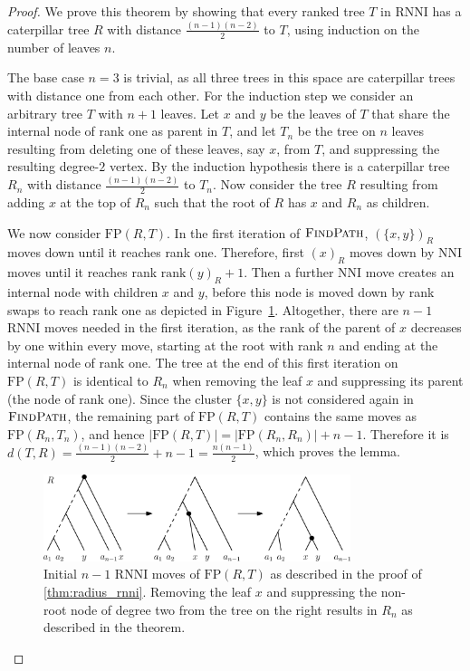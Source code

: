 \documentclass[11pt]{amsart}
\newcommand{\rnni}{\mathrm{RNNI}}
\newcommand{\findpath}{\textsc{FindPath}}
\newcommand{\rank}{\mathrm{rank}}
\newcommand{\nni}{\mathrm{NNI}}
\newcommand{\fp}{\mathrm{FP}}
\providecommand{\DIFaddtex}[1]{{\protect\color{blue}\uwave{#1}}} %
\providecommand{\DIFdeltex}[1]{{\protect\color{red}\sout{#1}}}                      %
\providecommand{\DIFaddbegin}{} %
\providecommand{\DIFaddend}{} %
\providecommand{\DIFdelbegin}{} %
\providecommand{\DIFdelend}{} %
\providecommand{\DIFadd}[1]{\texorpdfstring{\DIFaddtex{#1}}{#1}} %
\providecommand{\DIFdel}[1]{\texorpdfstring{\DIFdeltex{#1}}{}} %
\newcommand{\DIFscaledelfig}{0.5}
\newlength{\DIFdelgraphicswidth} %
\newlength{\DIFdelgraphicsheight} %
\newcommand{\DIFaddincludegraphics}[2][]{{\color{blue}\fbox{\DIFOincludegraphics[#1]{#2}}}} %
\newcommand{\DIFdelincludegraphics}[2][]{%
\sbox{\DIFdelgraphicsbox}{\DIFOincludegraphics[#1]{#2}}%
\settoboxwidth{\DIFdelgraphicswidth}{\DIFdelgraphicsbox} %
\settoboxtotalheight{\DIFdelgraphicsheight}{\DIFdelgraphicsbox} %
\scalebox{\DIFscaledelfig}{%
\parbox[b]{\DIFdelgraphicswidth}{\usebox{\DIFdelgraphicsbox}\\[-\baselineskip] \rule{\DIFdelgraphicswidth}{0em}}\llap{\resizebox{\DIFdelgraphicswidth}{\DIFdelgraphicsheight}{%
\setlength{\unitlength}{\DIFdelgraphicswidth}%
\begin{picture}(1,1)%
\thicklines\linethickness{2pt} %
{\color[rgb]{1,0,0}\put(0,0){\framebox(1,1){}}}%
{\color[rgb]{1,0,0}\put(0,0){\line( 1,1){1}}}%
{\color[rgb]{1,0,0}\put(0,1){\line(1,-1){1}}}%
\end{picture}%
}\hspace*{3pt}}} %
} %
\DeclareRobustCommand{\DIFaddbegin}{\DIFOaddbegin \let\includegraphics\DIFaddincludegraphics} %
\DeclareRobustCommand{\DIFaddend}{\DIFOaddend \let\includegraphics\DIFOincludegraphics} %
\DeclareRobustCommand{\DIFdelbegin}{\DIFOdelbegin \let\includegraphics\DIFdelincludegraphics} %
\DeclareRobustCommand{\DIFdelend}{\DIFOaddend \let\includegraphics\DIFOincludegraphics} %
\begin{document}
\begin{proof}
	We prove this theorem by showing that every ranked tree $T$ in $\rnni$ has a caterpillar tree $R$ with distance $\frac{(n-1)(n-2)}{2}$ to $T$, using induction on the number of leaves $n$.

	The base case $n=3$ is trivial, as all three trees in this space are caterpillar trees with distance one from each other.
	For the induction step we consider an arbitrary tree $T$ with $n+1$ leaves.
	Let $x$ and $y$ be the leaves of $T$ that share the internal node of rank one as parent in $T$, and let $T_n$ be the tree on $n$ leaves resulting from deleting one of these leaves, say $x$, from $T$, and suppressing the resulting degree-$2$ vertex.
	By the induction hypothesis there is a caterpillar tree $R_n$ with distance $\frac{(n-1)(n-2)}{2}$ to $T_n$.
	Now consider the tree $R$ resulting from adding $x$ at the top of $R_n$ such that the root of $R$ has $x$ and $R_n$ as children.

	We now consider $\fp(R,T)$.
	In the first iteration of $\findpath$, $(\{x,y\})_R$ moves down until it reaches rank one.
	Therefore, first $(x)_R$ moves down by $\nni$ moves until it reaches rank $\rank(y)_R + 1$.
	Then a further $\nni$ move creates an internal node with children $x$ and $y$, before this node is moved down by rank swaps to reach rank one as depicted in Figure~\ref{fig:max_dist_ctree}.
	Altogether, there are $n-1$ $\rnni$ moves needed in the first iteration, as the rank of the parent of $x$ decreases by one within every move, starting at the root with rank $n$ and ending at the internal node of rank one.
	The tree at the end of this first iteration on $\fp(R,T)$ is identical to $R_n$ when removing the leaf $x$ and suppressing its parent (the node of rank one).
	Since the cluster $\{x,y\}$ is not considered again in $\findpath$, the remaining part of $\fp(R,T)$ contains the same moves as $\fp(R_n,T_n)$, and hence $|\fp(R,T)| = |\fp(R_n,R_n)| + n-1$.
	Therefore it is \DIFdelbegin \DIFdel{$d(T,R) = \frac{(n-1)(n-2)}{2} + n-1 = \frac{n(n-1)}{2}$}\DIFdelend \DIFaddbegin \DIFadd{$d_{\rnni}(T,R) = \frac{(n-1)(n-2)}{2} + n-1 = \frac{n(n-1)}{2}$}\DIFaddend , which proves the lemma.
	\begin{figure}[ht]
		\includegraphics[width=0.8\textwidth]{max_dist_ctree.eps}
		\caption{Initial $n - 1$ $\rnni$ moves of $\fp(R,T)$ as described in the proof of \autoref{thm:radius_rnni}.
		Removing the leaf $x$ and suppressing the non-root node of degree two from the tree on the right results in $R_n$ as described in the theorem.}
		\label{fig:max_dist_ctree}
	\end{figure}
\end{proof}
\end{document}
